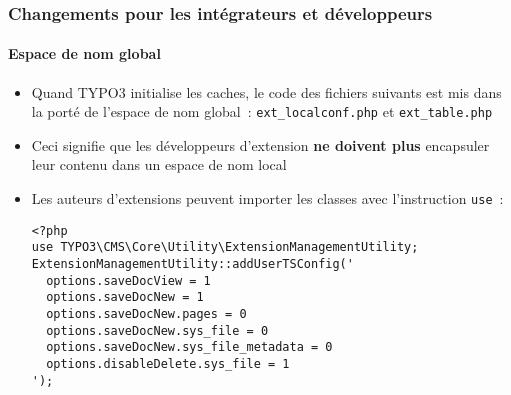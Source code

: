%

\begin{frame}[fragile]
	\frametitle{Changements pour les intégrateurs et développeurs}
	\framesubtitle{Espace de nom global}


	\begin{itemize}
		\item Quand TYPO3 initialise les caches, le code des fichiers suivants est
			mis dans la porté de l'espace de nom global~:\newline
			\small\texttt{ext\_localconf.php} et \texttt{ext\_table.php}\normalsize
		\item Ceci signifie que les développeurs d'extension \textbf{ne doivent plus} encapsuler leur
			contenu dans un espace de nom local
		\item Les auteurs d'extensions peuvent importer les classes avec l'instruction
			\texttt{use}~:
\begin{lstlisting}
<?php
use TYPO3\CMS\Core\Utility\ExtensionManagementUtility;
ExtensionManagementUtility::addUserTSConfig('
  options.saveDocView = 1
  options.saveDocNew = 1
  options.saveDocNew.pages = 0
  options.saveDocNew.sys_file = 0
  options.saveDocNew.sys_file_metadata = 0
  options.disableDelete.sys_file = 1
');
\end{lstlisting}

	\end{itemize}
\end{frame}

